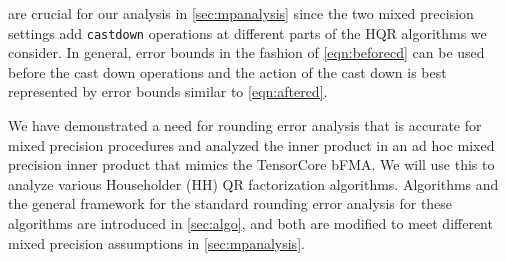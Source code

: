 \documentclass[review,onefignum,onetabnum]{siamart190516}
\newcommand{\F}{\mathbb{F}}
\newcommand{\bb}[1]{\mathbf{#1}}
\newcommand{\fl}{\mathrm{fl}}
\begin{document}
 are crucial for our analysis in \cref{sec:mpanalysis} since  
the two mixed precision settings add {\tt castdown} operations at different parts of the HQR algorithms we consider.
In general, error bounds in the fashion of \cref{eqn:beforecd} can be used before the cast down operations and the action of the cast down is best represented by error bounds similar to \cref{eqn:aftercd}.\par

We have demonstrated a need for rounding error analysis that is accurate for mixed precision procedures and analyzed the inner product in an ad hoc mixed precision inner product that mimics the TensorCore bFMA.
We will use this to analyze various Householder (HH) QR factorization algorithms.
Algorithms and the general framework for the standard rounding error analysis for these algorithms are introduced in \cref{sec:algo}, and both are modified to meet different mixed precision assumptions in \cref{sec:mpanalysis}.
\end{document}
